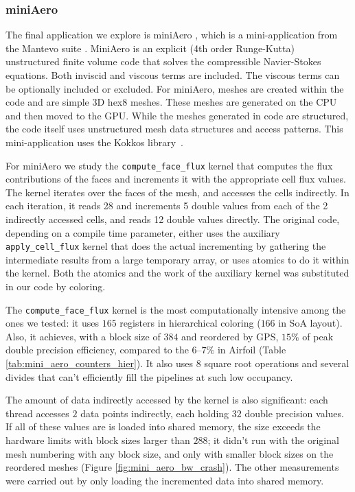 
\subsubsection{miniAero}\label{sec:mini-aero-summary}

The final application we explore is miniAero \cite{miniaero}, which is a 
mini-application from the Mantevo suite \cite{heroux2009improving}. MiniAero is 
an explicit (4th order Runge-Kutta) unstructured finite volume code that solves 
the compressible Navier-Stokes equations. Both inviscid and viscous terms are 
included. The viscous terms can be optionally included or excluded. For 
miniAero, meshes are created within the code and are simple 3D hex8 meshes. 
These meshes are generated on the CPU and then moved to the GPU. While 
the meshes generated in code are structured, the code itself uses unstructured 
mesh data structures and access patterns. This mini-application uses the Kokkos 
library~\cite{CarterEdwards20143202}.

For miniAero we study the \texttt{compute\_face\_flux} kernel that computes the
flux contributions of the faces and increments it with the appropriate cell flux
values. The kernel iterates over the faces of the mesh, and accesses the cells
indirectly. In each iteration, it reads 28 and increments 5 double values from
each of the 2 indirectly accessed cells, and reads 12 double values directly. 
The original code, depending on a compile time parameter, either uses 
the auxiliary \texttt{apply\_cell\_flux} kernel that does the actual 
incrementing by gathering the intermediate results from a large temporary array, 
or uses atomics to do it within the kernel. Both the atomics and the work of 
the auxiliary kernel was substituted in our code by coloring.




The \texttt{compute\_face\_flux} kernel is the most computationally intensive
among the ones we tested: it uses $165$ registers in hierarchical coloring
($166$ in SoA layout). Also, it achieves, with a block size of $384$ and 
reordered by GPS, $15\%$ of peak double precision efficiency, compared to the 
$6$--$7\%$ in Airfoil (Table \ref{tab:mini_aero_counters_hier}). It also uses 
$8$ square root operations and several divides that can't efficiently fill the 
pipelines at such low occupancy. 

The amount of data indirectly accessed by the kernel is also significant: each 
thread accesses $2$ data points indirectly, each holding $32$ double precision 
values. If all of these values are is loaded into shared memory, the size 
exceeds the hardware limits with block sizes larger than $288$; it didn't run 
with the original mesh numbering with any block size, and only with smaller 
block sizes on the reordered meshes (Figure \ref{fig:mini_aero_bw_crash}). The 
other measurements were carried out by only loading the incremented data into 
shared memory.

